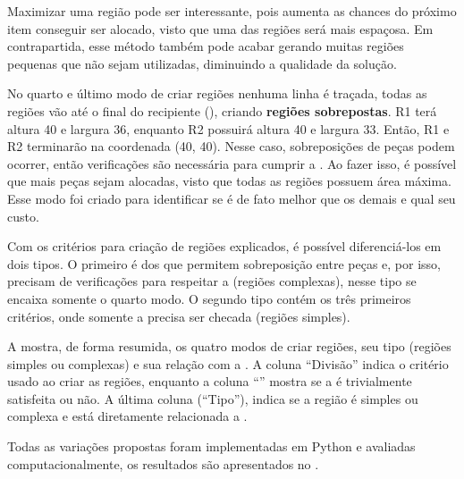 

Maximizar uma região pode ser interessante, pois aumenta as chances do próximo item conseguir ser
alocado, visto que uma das regiões será mais espaçosa.
Em contrapartida, esse método também pode acabar gerando muitas regiões pequenas que não sejam
utilizadas, diminuindo a qualidade da solução.

No quarto e último modo de criar regiões nenhuma linha é traçada, todas as regiões vão até o final
do recipiente (), criando \textbf{regiões sobrepostas}.
R1 terá altura 40 e largura 36, enquanto R2 possuirá altura 40 e largura 33.
Então, R1 e R2 terminarão na coordenada (40, 40).
Nesse caso, sobreposições de peças podem ocorrer, então verificações são necessária para cumprir
a .
Ao fazer isso, é possível que mais peças sejam alocadas, visto que todas as regiões possuem área
máxima.
Esse modo foi criado para identificar se é de fato melhor que os demais e qual seu custo.



Com os critérios para criação de regiões explicados, é possível diferenciá-los em dois tipos.
O primeiro é dos que permitem sobreposição entre peças e, por isso, precisam de verificações para
respeitar a  (regiões complexas), nesse tipo se encaixa somente o quarto modo.
O segundo tipo contém os três primeiros critérios, onde somente a  precisa ser checada
(regiões simples).

A  mostra, de forma resumida, os quatro modos de criar regiões,
seu tipo (regiões simples ou complexas) e sua relação com a .
A coluna “Divisão” indica o critério usado ao criar as regiões, enquanto a coluna “”
mostra se a  é trivialmente satisfeita ou não.
A última coluna (“Tipo”), indica se a região é simples ou complexa e está diretamente relacionada
a .



Todas as variações propostas foram implementadas em Python e avaliadas computacionalmente,
os resultados são apresentados no .
